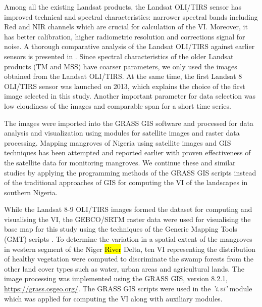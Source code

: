 \documentclass[jmse,article,submit,pdftex,moreauthors]{Definitions/mdpi}
\begin{document}
Among all the existing Landsat products, the Landsat OLI/TIRS sensor has improved technical and spectral characteristics: narrower spectral bands including Red and NIR channels which are crucial for calculation of the VI. Moreover, it has better calibration, higher radiometric resolution and corrections signal for noise. A thorough comparative analysis of the Landsat OLI/TIRS against earlier sensors is presented in \cite{ROY201657}. Since spectral characteristics of the older Landsat products (TM and MSS) have coarser parameters, we only used the images obtained from the Landsat OLI/TIRS. At the same time, the first Landsat 8 OLI/TIRS sensor was launched on 2013, which explains the choice of the first image selected in this study. Another important parameter for data selection was low cloudiness of the images and comparable span for a short time series. 

The images were imported into the GRASS GIS software and processed for data analysis and visualization using modules for satellite images and raster data processing. Mapping mangroves of Nigeria using satellite images and GIS techniques has been attempted and reported earlier \cite{Ozigis,GUNDLACH2022100831,Sobande,ijerph2006030011} with proven effectiveness of the satellite data for monitoring mangroves. We continue these and similar studies by applying the programming methods of the GRASS GIS scripts instead of the traditional approaches of GIS for computing the VI of the landscapes in southern Nigeria. 

While the Landsat 8-9 OLI/TIRS images formed the dataset for computing and visualising the VI, the GEBCO/SRTM raster data were used for visualising the base map for this study using the techniques of the Generic Mapping Tools (GMT) scripts \cite{Lemenkova202228,Lemenkova202301}. To determine the variation in a spatial extent of the mangroves in western segment of the Niger \hl{River} Delta, ten VI representing the distribution of healthy vegetation were computed to discriminate the swamp forests from the other land cover types such as water, urban areas and agricultural lands. The image processing was implemented using the GRASS GIS, version 8.2.1, \href{https://grass.osgeo.org/}{https://grass.osgeo.org/}. The GRASS GIS scripts were used in the \emph{'i.vi'} module which was applied for computing the VI along with auxiliary modules. 
\end{document}
